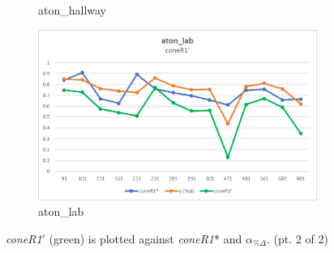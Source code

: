 \begin{appendices}
\begin{figure}
\begin{subfigure}{.45\linewidth}
  \caption{aton\_hallway}
\end{subfigure}
\hfill
\begin{subfigure}{.45\linewidth}
  \includegraphics[width=1\linewidth]{figures/appendix/lab_prime.jpg}
  \caption{aton\_lab}
\end{subfigure}

\caption{\textit{coneR1}$'$ (green) is plotted against \textit{coneR1}* and $\alpha_{\%\Delta}$. (pt. 2 of 2)}
\end{figure}


\end{appendices}
